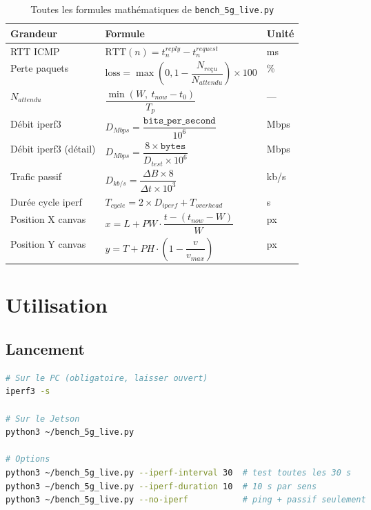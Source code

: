 \documentclass[a4paper,12pt]{article}
\begin{document}
\begin{table}[H]
\centering
\begin{tabular}{p{4.5cm}p{7cm}l}
\toprule
\textbf{Grandeur} & \textbf{Formule} & \textbf{Unité} \\
\midrule
RTT ICMP &
$\text{RTT}(n) = t^{reply}_n - t^{request}_n$ &
ms \\[8pt]
Perte paquets &
$\text{loss} = \max\!\left(0, 1 - \dfrac{N_{reçu}}{N_{attendu}}\right) \times 100$ &
\% \\[10pt]
$N_{attendu}$ &
$\dfrac{\min(W,\ t_{now} - t_0)}{T_p}$ & — \\[10pt]
Débit iperf3 &
$D_{Mbps} = \dfrac{\texttt{bits\_per\_second}}{10^6}$ &
Mbps \\[10pt]
Débit iperf3 (détail) &
$D_{Mbps} = \dfrac{8 \times \texttt{bytes}}{D_{test} \times 10^6}$ &
Mbps \\[10pt]
Trafic passif &
$D_{kb/s} = \dfrac{\Delta B \times 8}{\Delta t \times 10^3}$ &
kb/s \\[10pt]
Durée cycle iperf &
$T_{cycle} = 2 \times D_{iperf} + T_{overhead}$ &
s \\[8pt]
Position X canvas &
$x = L + PW \cdot \dfrac{t - (t_{now}-W)}{W}$ &
px \\[10pt]
Position Y canvas &
$y = T + PH \cdot \left(1 - \dfrac{v}{v_{max}}\right)$ &
px \\
\bottomrule
\end{tabular}
\caption{Toutes les formules mathématiques de \texttt{bench\_5g\_live.py}}
\end{table}

\section{Utilisation}

\subsection{Lancement}

\begin{lstlisting}[language=bash]
# Sur le PC (obligatoire, laisser ouvert)
iperf3 -s

# Sur le Jetson
python3 ~/bench_5g_live.py

# Options
python3 ~/bench_5g_live.py --iperf-interval 30  # test toutes les 30 s
python3 ~/bench_5g_live.py --iperf-duration 10  # 10 s par sens
python3 ~/bench_5g_live.py --no-iperf           # ping + passif seulement
\end{lstlisting}
\end{document}
